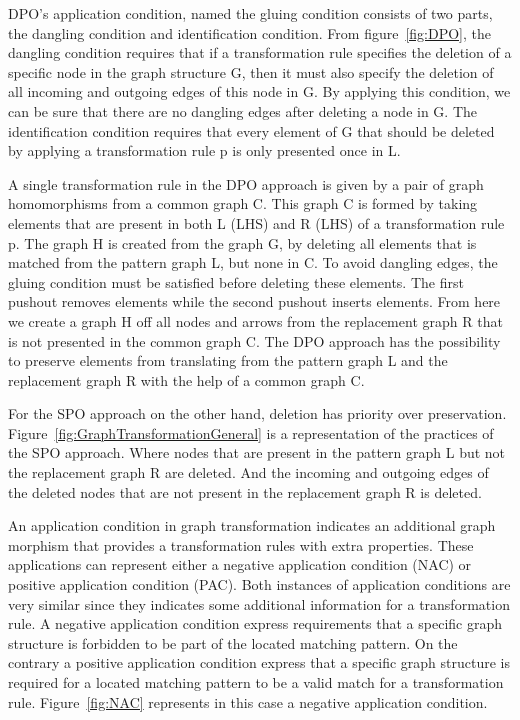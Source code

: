 \noindent DPO's application condition, named the gluing
condition\cite{Loewe1997} consists of two parts, the dangling condition
and identification condition. From figure~\ref{fig:DPO}, the dangling
condition requires that if a transformation rule specifies the deletion of a
specific node in the graph structure G, then it must also specify the deletion
of all incoming and outgoing edges of this node in G. By applying this
condition, we can be sure that there are no dangling edges after deleting a
node in G. The identification condition requires that every element of G that
should be deleted by applying a transformation rule p is only presented once in
L.

A single transformation rule in the DPO approach is given by a pair of graph
homomorphisms from a common graph C. This graph C is formed by taking
elements that are present in both L (LHS) and R (LHS) of a transformation rule
p. The graph H is created from the graph G, by deleting all elements that is
matched from the pattern graph L, but none in C. To avoid dangling edges,
the gluing condition must be satisfied before deleting these elements. The first
pushout removes elements while the second pushout inserts elements. From here
we create a graph H off all nodes and arrows from the replacement graph R that
is not presented in the common graph C. The DPO approach has the possibility to
preserve elements from translating from the pattern graph L and the replacement
graph R with the help of a common graph C.

For the SPO approach on the other hand, deletion has priority over preservation.
Figure~\ref{fig:GraphTransformationGeneral} is a representation of the practices
of the SPO approach. Where nodes that are present in the pattern graph L but not
the replacement graph R are deleted. And the incoming and outgoing edges of the
deleted nodes that are not present in the replacement graph R is deleted.

An application condition in graph transformation indicates an additional graph
morphism that provides a transformation rules with extra properties. These
applications can represent either a negative application condition (NAC) or
positive application condition (PAC). Both instances of application conditions
are very similar since they indicates some additional information for a transformation rule. A
negative application condition express requirements that a specific graph
structure is forbidden to be part of the located matching pattern. On the
contrary a positive application condition express that a specific graph
structure is required for a located matching pattern to be a valid match for a
transformation rule. Figure~\ref{fig:NAC} represents in this case a negative
application condition\cite{habel1996graph}.

